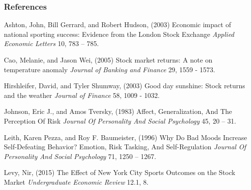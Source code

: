 \documentclass[]{beamer}
\begin{document}
\begin{frame} 
	\frametitle{References}
	
	\begin{thebibliography}{99}
		\scriptsize %

			Ashton, John, Bill Gerrard, and Robert Hudson, (2003)
			\newblock Economic impact of national sporting success: Evidence from the London Stock Exchange
			\newblock \emph{Applied Economic Letters} 10, 783 – 785.

			Cao, Melanie, and Jason Wei, (2005)
			\newblock Stock market returns: A note on temperature anomaly
			\newblock \emph{Journal of Banking and Finance} 29, 1559 - 1573.

			Hirshleifer, David, and Tyler Shumway, (2003)
			\newblock Good day sunshine: Stock returns and the weather
			\newblock \emph{Journal of Finance} 58, 1009 - 1032.

			Johnson, Eric J., and Amos Tversky, (1983)
			\newblock Affect, Generalization, And The Perception Of Risk
			\newblock \emph{Journal Of Personality And Social Psychology} 45, 20 – 31.

			Leith, Karen Pezza, and Roy F. Baumeister, (1996)
			\newblock Why Do Bad Moods Increase Self-Defeating Behavior? Emotion, Risk Tasking, And Self-Regulation
			\newblock \emph{Journal Of Personality And Social Psychology} 71, 1250 – 1267.

   
			Levy, Nir, (2015)
			\newblock The Effect of New York City Sports Outcomes on the Stock Market
			\newblock \emph{Undergraduate Economic Review} 12.1, 8.

   
	\end{thebibliography}
\end{frame}
\end{document}
